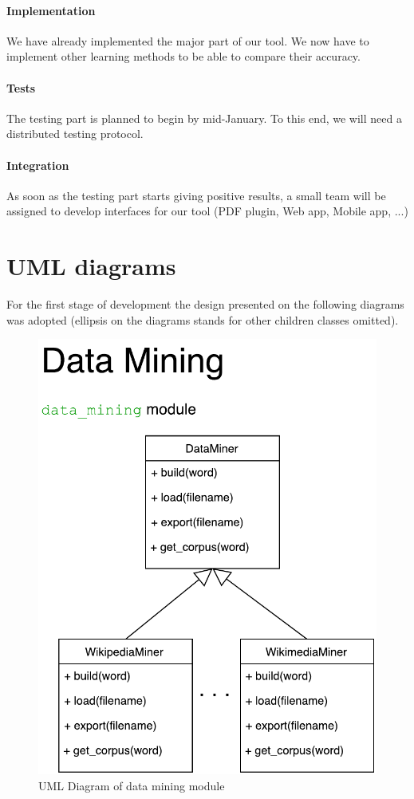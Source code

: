 \documentclass[11pt,a4paper]{article}
\begin{document}
\paragraph{Implementation} We have already implemented the major part of our tool. We now have to implement other learning methods to be able to compare their accuracy.

\paragraph{Tests} The testing part is planned to begin by mid-January. To this end, we will need a distributed testing protocol.

\paragraph{Integration} As soon as the testing part starts giving positive results, a small team will be assigned to develop interfaces for our tool (PDF plugin, Web app, Mobile app, ...)





\newpage
\appendix

\section{UML diagrams}

For the first stage of development the design presented on the following diagrams was adopted (ellipsis on the diagrams stands for other children classes omitted).

\begin{figure}[h!]
    \centering
    \includegraphics[width=12cm]{diagrams/Ambiruptor_data_mining.pdf}
    \caption{UML Diagram of data mining module}
    \label{fig:uml_data_mining}
\end{figure}
\end{document}
